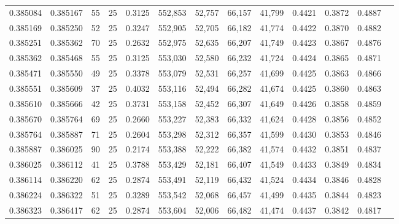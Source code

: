 \begin{tabular}{rrrrrrrrrrrrr}
0.385084 & 0.385167 &    55 &  25 &                                     0.3125 & 552,853 &  52,757 &  66,157 &  41,799 & 0.4421 & 0.3872 & 0.4887 \\
0.385169 & 0.385250 &    52 &  25 &                                     0.3247 & 552,905 &  52,705 &  66,182 &  41,774 & 0.4422 & 0.3870 & 0.4882 \\
0.385251 & 0.385362 &    70 &  25 &                                     0.2632 & 552,975 &  52,635 &  66,207 &  41,749 & 0.4423 & 0.3867 & 0.4876 \\
0.385362 & 0.385468 &    55 &  25 &                                     0.3125 & 553,030 &  52,580 &  66,232 &  41,724 & 0.4424 & 0.3865 & 0.4871 \\
0.385471 & 0.385550 &    49 &  25 &                                     0.3378 & 553,079 &  52,531 &  66,257 &  41,699 & 0.4425 & 0.3863 & 0.4866 \\
0.385551 & 0.385609 &    37 &  25 &                                     0.4032 & 553,116 &  52,494 &  66,282 &  41,674 & 0.4425 & 0.3860 & 0.4863 \\
0.385610 & 0.385666 &    42 &  25 &                                     0.3731 & 553,158 &  52,452 &  66,307 &  41,649 & 0.4426 & 0.3858 & 0.4859 \\
0.385670 & 0.385764 &    69 &  25 &                                     0.2660 & 553,227 &  52,383 &  66,332 &  41,624 & 0.4428 & 0.3856 & 0.4852 \\
0.385764 & 0.385887 &    71 &  25 &                                     0.2604 & 553,298 &  52,312 &  66,357 &  41,599 & 0.4430 & 0.3853 & 0.4846 \\
0.385887 & 0.386025 &    90 &  25 &                                     0.2174 & 553,388 &  52,222 &  66,382 &  41,574 & 0.4432 & 0.3851 & 0.4837 \\
0.386025 & 0.386112 &    41 &  25 &                                     0.3788 & 553,429 &  52,181 &  66,407 &  41,549 & 0.4433 & 0.3849 & 0.4834 \\
0.386114 & 0.386220 &    62 &  25 &                                     0.2874 & 553,491 &  52,119 &  66,432 &  41,524 & 0.4434 & 0.3846 & 0.4828 \\
0.386224 & 0.386322 &    51 &  25 &                                     0.3289 & 553,542 &  52,068 &  66,457 &  41,499 & 0.4435 & 0.3844 & 0.4823 \\
0.386323 & 0.386417 &    62 &  25 &                                     0.2874 & 553,604 &  52,006 &  66,482 &  41,474 & 0.4437 & 0.3842 & 0.4817 \\

\end{tabular}
